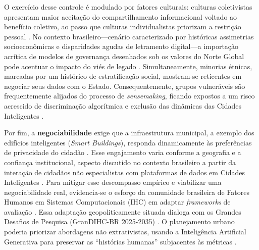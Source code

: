 \documentclass[12pt]{article}
\begin{document}
    O exercício desse controle é modulado por fatores culturais: culturas coletivistas apresentam maior aceitação do compartilhamento informacional voltado ao benefício coletivo, ao passo que culturas individualistas priorizam a restrição pessoal \cite{Locoro2020}. No contexto brasileiro---cenário caracterizado por históricas assimetrias socioeconômicas e disparidades agudas de letramento digital---a importação acrítica de modelos de governança desenhados sob os valores do Norte Global pode acentuar o impacto do viés de legado \cite{Friedman2024}. Simultaneamente, minorias étnicas, marcadas por um histórico de estratificação social, mostram-se reticentes em negociar seus dados com o Estado. Consequentemente, grupos vulneráveis são frequentemente alijados do processo de \textit{sensemaking}, ficando expostos a um risco acrescido de discriminação algorítmica e exclusão das dinâmicas das Cidades Inteligentes \cite{malgieri2020vulnerable, Yuan20243615}.

    Por fim, a \textbf{negociabilidade} exige que a infraestrutura municipal, a exemplo dos edifícios inteligentes (\textit{Smart Buildings}), responda dinamicamente às preferências de privacidade do cidadão \cite{bavaresco2019technological, Brombacher20221863}. Esse engajamento varia conforme a geografia e a confiança institucional, aspecto discutido no contexto brasileiro a partir da interação de cidadãos não especialistas com plataformas de dados em Cidades Inteligentes \cite{Belizario2023Interacao}. Para mitigar esse descompasso empírico e viabilizar uma negociabilidade real, evidencia-se o esforço da comunidade brasileira de Fatores Humanos em Sistemas Computacionais (IHC) em adaptar \textit{frameworks} de avaliação \cite{Belizario2023Interacao, Victorelli2020Human, barcellos2022towards}. Essa adaptação geopoliticamente situada dialoga com os Grandes Desafios de Pesquisa (GranDIHC-BR 2025-2035) \cite{Pereira}. O planejamento urbano poderia priorizar abordagens não extrativistas, usando a Inteligência Artificial Generativa para preservar as ``histórias humanas'' subjacentes às métricas \cite{ferreira2024connecting}.
    
\end{document}

